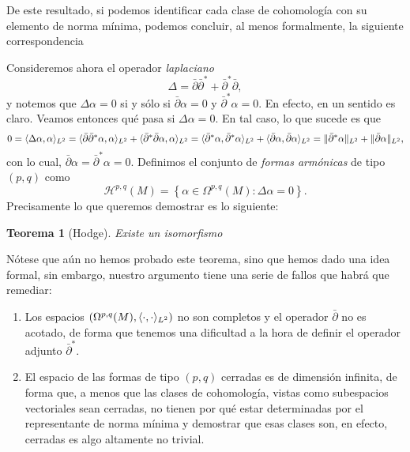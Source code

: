 \documentclass[12pt,a4paper]{article}
\newtheorem{thm}{Teorema}[section]
\theoremstyle{definition} \newtheorem{defn}[thm]{Definición}
\theoremstyle{definition} \newtheorem{ejemplo}[thm]{Ejemplo}
\theoremstyle{definition} \newtheorem{ejercicio}[thm]{Ejercicio}
\theoremstyle{remark} \newtheorem*{obs}{Observación}
\DeclarePairedDelimiter\norm{\lVert}{\rVert}
\DeclarePairedDelimiter\esc{\langle}{\rangle}
\newcommand{\dol}{\bar{\partial}}
\newcommand{\HH}{\mathcal{H}}
\begin{document}
  De este resultado, si podemos identificar cada clase de cohomología con su elemento de norma mínima, podemos concluir, al menos formalmente, la siguiente correspondencia
  \begin{center}
  \end{center}
  Consideremos ahora el operador \emph{laplaciano}
  \begin{equation*}
    \Delta = \dol \dol^* + \dol^* \dol,
  \end{equation*}
  y notemos que $\Delta \alpha = 0$ si y sólo si $\dol \alpha = 0$ y $\dol^*\alpha =0$. En efecto, en un sentido es claro. Veamos entonces qué pasa si $\Delta \alpha = 0$. En tal caso, lo que sucede es que
  \begin{equation*}
    0 = \esc{\Delta \alpha, \alpha}_{L^2} = \esc{\dol \dol^* \alpha, \alpha}_{L^2} + \esc{\dol^* \dol \alpha, \alpha}_{L^2} = \esc{\dol^* \alpha, \dol^* \alpha}_{L^2} + \esc{\dol \alpha, \dol \alpha}_{L^2} = \norm{\dol^* \alpha}_{L^2} + \norm{\dol \alpha}_{L^2},
  \end{equation*}
  con lo cual, $\dol \alpha = \dol^*\alpha=0$. Definimos el conjunto de \emph{formas armónicas} de tipo $(p,q)$ como 
  \begin{equation*}
    \HH^{p,q}(M)=\left\{ \alpha \in \Omega^{p,q}(M) : \Delta \alpha=0 \right\}.   
  \end{equation*}
 Precisamente lo que queremos demostrar es lo siguiente:
 \begin{thm}[Hodge]
   Existe un isomorfismo
   \begin{center}
   \end{center}
 \end{thm}
   
 Nótese que aún no hemos probado este teorema, sino que hemos dado una idea formal, sin embargo, nuestro argumento tiene una serie de fallos que habrá que remediar:
 \begin{enumerate}
   \item Los espacios $(\Omega^{p,q}(M),\esc{\cdot,\cdot}_{L^2})$ no son completos y el operador $\dol$ no es acotado, de forma que tenemos una dificultad a la hora de definir el operador adjunto $\dol^*$.
   \item El espacio de las formas de tipo $(p,q)$ cerradas es de dimensión infinita, de forma que, a menos que las clases de cohomología, vistas como subespacios vectoriales sean cerradas, no tienen por qué estar determinadas por el representante de norma mínima y demostrar que esas clases son, en efecto, cerradas es algo altamente no trivial.
 \end{enumerate}
\end{document}
